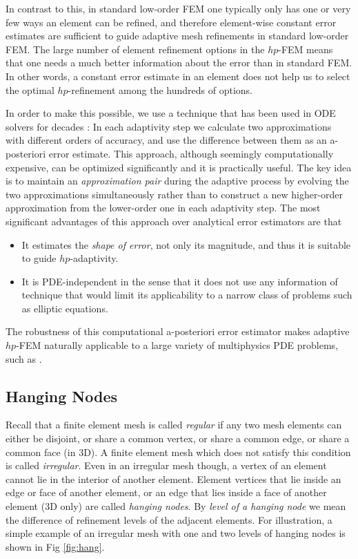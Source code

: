 \documentclass[final,3p,times,twocolumn]{elsarticle}
\begin{document}
In contrast to this, in standard low-order FEM one 
typically only has one or very few ways an element 
can be refined, and therefore element-wise constant 
error estimates are sufficient to guide adaptive 
mesh refinements in standard low-order FEM. 
The large number of element refinement options 
in the $hp$-FEM means that one needs a much better 
information about the error than in standard FEM.
In other words, a constant error estimate in an element
does not help us to select the optimal $hp$-refinement
among the hundreds of options.

In order to make this possible, we use a technique 
that has been used in ODE solvers for decades \cite{hairer}:
In each adaptivity step we calculate two approximations 
with different orders of accuracy, and use the
difference between them as an a-posteriori error 
estimate. This approach, although 
seemingly computationally expensive, can be optimized 
significantly \cite{pdeindep} and it is practically 
useful. The key idea is to maintain an {\em approximation 
pair} during the adaptive process by evolving the two 
approximations simultaneously rather than to construct 
a new higher-order approximation from the lower-order one 
in each adaptivity step. The most significant advantages 
of this approach over analytical error estimators are that

\begin{itemize}
\item It estimates the {\em shape of error}, not only 
      its magnitude, and thus it is suitable to 
      guide $hp$-adaptivity.
\item It is PDE-independent in the sense that it does
      not use any information of technique that would
      limit its applicability to a narrow class of problems
      such as elliptic equations.
\end{itemize} 
The robustness of this computational a-posteriori error 
estimator makes adaptive $hp$-FEM naturally applicable to a large variety 
of multiphysics PDE problems, such as \cite{spacetime-1,spacetime-2}. 


\subsection{Hanging Nodes}\label{subsec:hang}

Recall that a finite element mesh is called
{\em regular} if any two mesh elements can 
either be disjoint, or share a common 
vertex, or share a common edge, or share
a common face (in 3D). A finite element 
mesh which does not satisfy this condition 
is called {\em irregular}. Even in an irregular 
mesh though, a vertex of an element cannot lie 
in the interior of another element. Element vertices 
that lie inside an edge or face of another 
element, or an edge that lies inside a face 
of another element (3D only) are called {\em
hanging nodes}. By {\em level of a hanging node}
we mean the difference of refinement levels of
the adjacent elements. For illustration, a simple example 
of an irregular mesh with one and two levels of
hanging nodes is shown in Fig \ref{fig:hang}.
\end{document}
